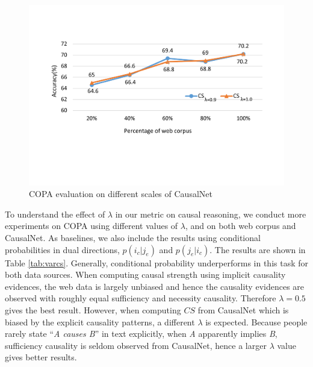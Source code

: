 \documentclass[letterpaper]{article}
\newcommand{\tabref}[1]{Table \ref{#1}}
\begin{document}
\begin{figure}[htb]
\centering
\includegraphics[width=0.8\columnwidth]{scale}
\caption{COPA evaluation on different scales of CausalNet}
\label{fig:scale}
\end{figure}

To understand the effect of $\lambda$ in our metric on
causal reasoning, we conduct more experiments on COPA using different values
of $\lambda$, and on both web corpus and CausalNet. As baselines,
we also include the results using conditional probabilities in
dual directions, $p(i_c | j_e)$ and $p(j_e | i_c)$. The results
are shown in \tabref{tab:varcs}.
Generally, conditional probability underperforms in this task for
both data sources. When computing causal strength using implicit
causality evidences,
the web data is largely unbiased and hence
the causality evidences are observed with roughly
equal sufficiency and necessity causality. Therefore $\lambda=0.5$ gives the best result.
However, when computing $CS$ from CausalNet which is biased
by the explicit causality patterns, a different $\lambda$ is expected.
Because people rarely state ``\textit{A causes B}'' in text explicitly,
when \textit{A} apparently implies \textit{B},
sufficiency causality is seldom observed from CausalNet,
hence a larger $\lambda$ value gives better results.
\end{document}
